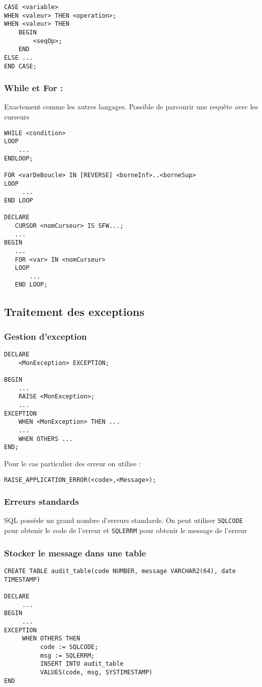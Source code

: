 \documentclass[10pt,a4paper,twoside]{article}
\begin{document}
\begin{verbatim}
CASE <variable>
WHEN <valeur> THEN <operation>;
WHEN <valeur> THEN
    BEGIN
        <seqOp>;
    END
ELSE ...
END CASE;
\end{verbatim}

\subsubsection{While et For :} Exactement comme les autres langages. Possible de parcourir une requête avec les curseurs
\begin{verbatim}
WHILE <condition>
LOOP
    ...
ENDLOOP;

FOR <varDeBoucle> IN [REVERSE] <borneInf>..<borneSup>
LOOP
     ...
END LOOP

DECLARE
   CURSOR <nomCurseur> IS SFW...;
   ...
BEGIN
   ...
   FOR <var> IN <nomCurseur>
   LOOP
       ...
   END LOOP;
\end{verbatim}

\subsection{Traitement des exceptions}
\subsubsection{Gestion d'exception}
\begin{verbatim}
DECLARE
    <MonException> EXCEPTION;
    
BEGIN
    ...
    RAISE <MonException>;
    ...
EXCEPTION
    WHEN <MonException> THEN ...
    ...
    WHEN OTHERS ...
END;
\end{verbatim}

Pour le cas particulier des erreur on utilise :
\begin{verbatim}
RAISE_APPLICATION_ERROR(<code>,<Message>);
\end{verbatim}

\subsubsection{Erreurs standards} SQL possède un grand nombre d'erreurs standards. On peut utiliser \verb=SQLCODE= pour obtenir le code de l'erreur et \verb=SQLERRM= pour obtenir le message de l'erreur

\subsubsection{Stocker le message dans une table}
\begin{verbatim}
CREATE TABLE audit_table(code NUMBER, message VARCHAR2(64), date TIMESTAMP)

DECLARE
     ...
BEGIN
     ...
EXCEPTION
     WHEN OTHERS THEN
          code := SQLCODE;
          msg := SQLERRM;
          INSERT INTO audit_table
          VALUES(code, msg, SYSTIMESTAMP)
END
\end{verbatim}
\end{document}

